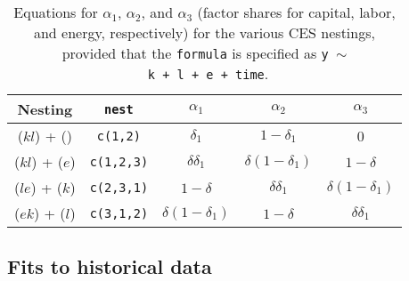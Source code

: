 \documentclass[preprint,authoryear,12pt]{elsarticle}\usepackage[]{graphicx}\usepackage[]{color}
\begin{document}
\begin{table} \caption{Equations for $\alpha_1$, $\alpha_2$, and $\alpha_3$ 
                        (factor shares for capital, labor, and energy, respectively)
                        for the various CES nestings, 
                        provided that the \texttt{formula} is specified as \texttt{y~$\sim$~k~+~l~+~e~+~time}.} 
\label{tab:CES_abg_equations} 
  \begin{center}
    \begin{tabular}{c c c c c} 
      \toprule
      Nesting         & \texttt{nest}     & $\alpha_1$              & $\alpha_2$              & $\alpha_3$       \\
      \midrule
      ($kl$) + ()     & \texttt{c(1,2)}   & $\delta_1$              & $1 - \delta_1$          & 0          \\
      ($kl$) + ($e$)  & \texttt{c(1,2,3)} & $\delta \delta_1$       & $\delta (1 - \delta_1)$ & $1 - \delta$ \\   
      ($le$) + ($k$)  & \texttt{c(2,3,1)} & $1 - \delta$            & $\delta \delta_1$       & $\delta (1 - \delta_1)$ \\
      ($ek$) + ($l$)  & \texttt{c(3,1,2)} & $\delta (1 - \delta_1)$ & $1 - \delta$            & $\delta \delta_1$ \\
      \bottomrule
    \end{tabular}
  \end{center}
\end{table}






\subsection{Fits to historical data} 
\label{sec:fits_to_historical_data}
\end{document}
